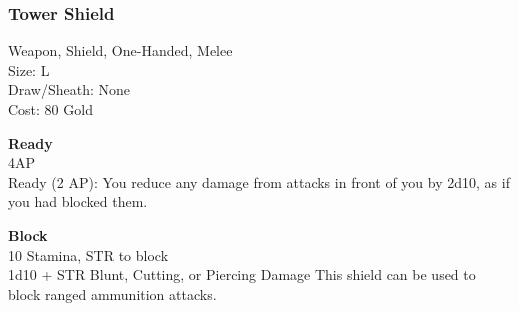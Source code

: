 \subsubsection{Tower Shield}\label{weapon:towerShield}
Weapon, Shield, One-Handed, Melee\\
Size: L\\
Draw/Sheath: None\\
Cost: 80 Gold

\textbf{Ready}\\
4AP\\
Ready (2 AP): You reduce any damage from attacks in front of you by 2d10, as if you had blocked them.

\textbf{Block}\\
10 Stamina, STR to block\\
1d10 + \texttimes STR Blunt, Cutting, or Piercing Damage
This shield can be used to block ranged ammunition attacks.\\